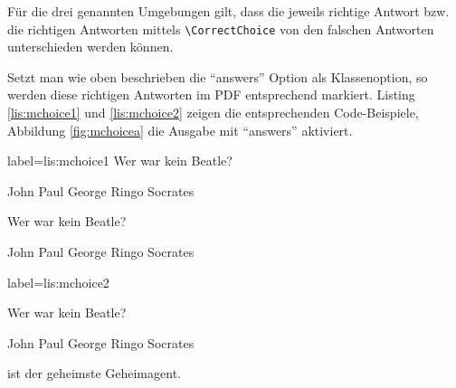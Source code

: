 Für die drei genannten Umgebungen gilt, dass die jeweils richtige Antwort bzw. die richtigen Antworten mittels \texttt{\textbackslash CorrectChoice} von den falschen Antworten unterschieden werden können. 

Setzt man wie oben beschrieben die \enquote{answers} Option als Klassenoption, so werden diese richtigen Antworten im PDF entsprechend markiert. 
Listing \ref{lis:mchoice1} und \ref{lis:mchoice2} zeigen die entsprechenden Code-Beispiele, Abbildung \ref{fig:mchoicea} die Ausgabe mit \enquote{answers} aktiviert.

\begin{lfgwcode}{label={lis:mchoice1}}
\question Wer war kein Beatle?

\begin{choices}
\choice John
\choice Paul
\choice George
\choice Ringo
\CorrectChoice Socrates
\end{choices}

\question Wer war kein Beatle?

\begin{checkboxes}
\choice John
\choice Paul
\choice George
\choice Ringo
\CorrectChoice Socrates
\end{checkboxes}
\end{lfgwcode}

\begin{lfgwcode}{label={lis:mchoice2}}

\question Wer war kein Beatle?

\begin{oneparcheckboxes}
\choice John
\choice Paul
\choice George
\choice Ringo
\CorrectChoice Socrates
\end{oneparcheckboxes}

\question {} ist der geheimste Geheimagent.

\end{lfgwcode}

